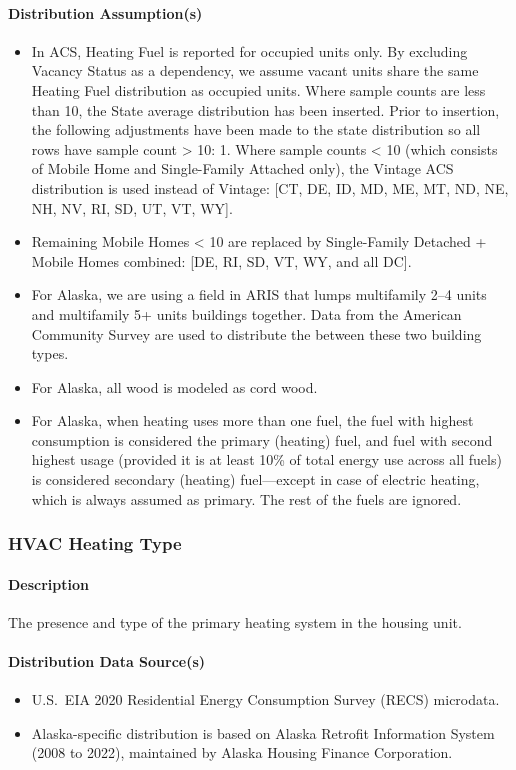 \paragraph{Distribution Assumption(s)}
\begin{itemize}
    \item In ACS, Heating Fuel is reported for occupied units only. By excluding Vacancy Status as a dependency, we assume vacant units share the same Heating Fuel distribution as occupied units. Where sample counts are less than 10, the State average distribution has been inserted. Prior to insertion, the following adjustments have been made to the state distribution so all rows have sample count > 10: 1. Where sample counts < 10 (which consists of Mobile Home and Single-Family Attached only), the Vintage ACS distribution is used instead of Vintage: [CT, DE, ID, MD, ME, MT, ND, NE, NH, NV, RI, SD, UT, VT, WY].
    \item Remaining Mobile Homes < 10 are replaced by Single-Family Detached + Mobile Homes combined: [DE, RI, SD, VT, WY, and all DC].
    \item For Alaska, we are using a field in ARIS that lumps multifamily 2--4 units and multifamily 5+ units buildings together. Data from the American Community Survey are used to distribute the between these two building types.
    \item For Alaska, all wood is modeled as cord wood.
    \item For Alaska, when heating uses more than one fuel, the fuel with highest consumption is considered the primary (heating) fuel, and fuel with second highest usage (provided it is at least 10\% of total energy use across all fuels) is considered secondary (heating) fuel---except in case of electric heating, which is always assumed as primary. The rest of the fuels are ignored.
\end{itemize}
 

\subsubsection{HVAC Heating Type}
\paragraph{Description}
The presence and type of the primary heating system in the housing unit.
\paragraph{Distribution Data Source(s)}
\begin{itemize}
    \item U.S.~EIA 2020 Residential Energy Consumption Survey (RECS) microdata. 
    \item Alaska-specific distribution is based on Alaska Retrofit Information System (2008 to 2022), maintained by Alaska Housing Finance Corporation.
\end{itemize}

